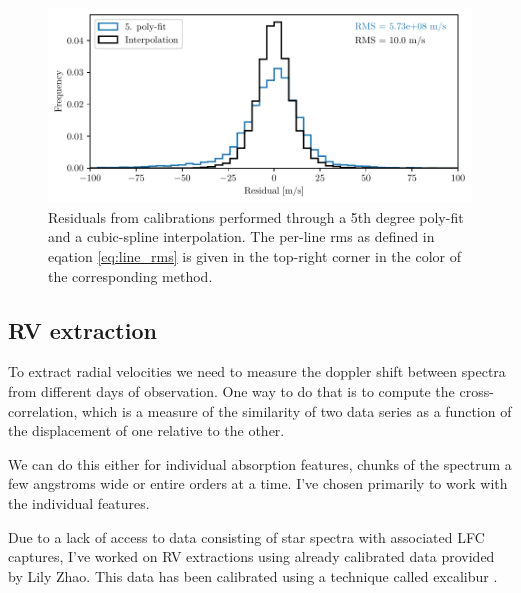     \begin{figure}%
        \begin{wide}  
            \includegraphics[width=\textwidth]{figures/calib/hist_peak_residuals_poly_and_interp.pdf}
            \caption{Residuals from calibrations performed through a 5th degree poly-fit and a cubic-spline interpolation. The per-line rms as defined in eqation \ref{eq:line_rms} is given in the top-right corner in the color of the corresponding method.}
            \label{fig:calib_poly_vs_interp}
        \end{wide}
    \end{figure}


\subsection{RV extraction}


    To extract radial velocities we need to measure the doppler shift between spectra from different days of observation. One way to do that is to compute the cross-correlation, which is a measure of the similarity of two data series as a function of the displacement of one relative to the other.
    
    We can do this either for individual absorption features, chunks of the spectrum a few angstroms wide or entire orders at a time. I've chosen primarily to work with the individual features.

    Due to a lack of access to data consisting of star spectra with associated LFC captures, I've worked on RV extractions using already calibrated data provided by Lily Zhao. This data has been calibrated using a technique called excalibur \cite{zhao2021excalibur}.
    
